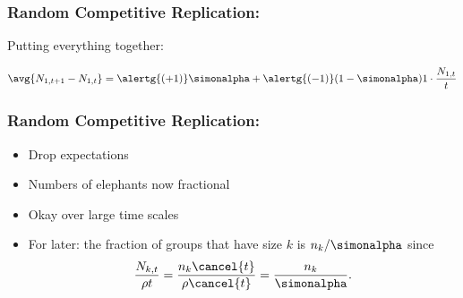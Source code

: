 \begin{frame}
  \frametitle{Random Competitive Replication:}

  \begin{block}{Putting everything together:}
  \end{block}

  \bigskip

  \begin{block}{}
   {
    $$
    \avg{N_{1,t+1} - N_{1,t}}
    =
    \alertg{(+1)}
    \simonalpha
    +
    \alertg{(-1)}
    (1-\simonalpha)
    1\cdot\frac{N_{1,t}}{t}
    $$
  }
  \end{block}

\end{frame}

\begin{frame}
  \frametitle{Random Competitive Replication:}

  \begin{block}{}

  \smallskip
  
  \end{block}

  \bigskip

  \begin{block}{}
    \begin{itemize}
    \item<2-> 
      Drop expectations
    \item<3-> 
      Numbers of elephants now fractional
    \item<4-> 
      Okay over large time scales 
    \end{itemize}
  \end{block}

  \begin{block}{}
    \begin{itemize}
    \item<5-> 
      For later:  the fraction of groups that have
      size $k$ is $n_k/\simonalpha$ since
      $$
      \frac{N_{k,t}}{\rho t} 
      = 
      \frac{n_{k} \cancel{t}}{\rho \cancel{t}}
      =
      \frac{n_{k}}{\simonalpha}.
      $$
    \end{itemize}
  \end{block}

\end{frame}

